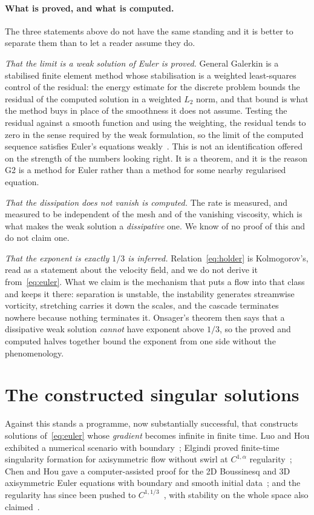 \documentclass[11pt]{article}
\begin{document}
\paragraph{What is proved, and what is computed.} The three statements above do not have the same
standing and it is better to separate them than to let a reader assume they do.

\emph{That the limit is a weak solution of Euler is proved.} General Galerkin is a stabilised
finite element method whose stabilisation is a weighted least-squares control of the residual: the
energy estimate for the discrete problem bounds the residual of the computed solution in a weighted
$L_2$ norm, and that bound is what the method buys in place of the smoothness it does not assume.
Testing the residual against a smooth function and using the weighting, the residual tends to zero
in the sense required by the weak formulation, so the limit of the computed sequence satisfies
Euler's equations weakly~\cite{book}. This is not an identification offered on the strength of the
numbers looking right. It is a theorem, and it is the reason G2 is a method for Euler rather than a
method for some nearby regularised equation.

\emph{That the dissipation does not vanish is computed.} The rate is measured, and measured to be
independent of the mesh and of the vanishing viscosity, which is what makes the weak solution a
\emph{dissipative} one. We know of no proof of this and do not claim one.

\emph{That the exponent is exactly $1/3$ is inferred.} Relation~\eqref{eq:holder} is Kolmogorov's,
read as a statement about the velocity field, and we do not derive it
from~\eqref{eq:euler}. What we claim is the mechanism that puts a flow into that class and keeps it
there: separation is unstable, the instability generates streamwise vorticity, stretching carries it
down the scales, and the cascade terminates nowhere because nothing terminates it. Onsager's
theorem then says that a dissipative weak solution \emph{cannot} have exponent above $1/3$, so the
proved and computed halves together bound the exponent from one side without the phenomenology.

\section{The constructed singular solutions}\label{sec:blowup}

Against this stands a programme, now substantially successful, that constructs solutions
of~\eqref{eq:euler} whose \emph{gradient} becomes infinite in finite time. Luo and Hou exhibited a
numerical scenario with boundary~\cite{luohou}; Elgindi proved finite-time singularity formation for
axisymmetric flow without swirl at $C^{1,\alpha}$ regularity~\cite{elgindi}; Chen and Hou gave a
computer-assisted proof for the 2D Boussinesq and 3D axisymmetric Euler equations with boundary and
smooth initial data~\cite{chenhou}; and the regularity has since been pushed to
$C^{1,1/3}$~\cite{chen2026}, with stability on the whole space also claimed~\cite{stable}.
\end{document}

